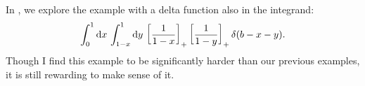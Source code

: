 \begin{subappendices}
In , we explore the example with a delta function also in the integrand:
\begin{align}
    \int_{0}^{1} \dd x\,
    \int_{1-x}^{1} \dd y\,
    \le[\frac{1}{1-x}\ri]_+
    \le[\frac{1}{1-y}\ri]_+
    \delta(b - x - y)
    \label{eq:two-plus_one-delta}
    .
\end{align}
%
Though I find this example to be significantly harder than our previous examples, it is still rewarding to make sense of it.



\end{subappendices}



